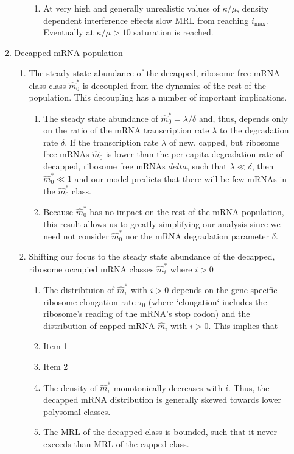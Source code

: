 \documentclass[review]{elsarticle}
\newcommand{\imax}{\ensuremath{i_{\max}}\xspace}
\newcommand{\mhat}{\ensuremath{\hat{m}}\xspace}
\begin{document}
\begin{enumerate}
\begin{enumerate}
\begin{enumerate}
\begin{enumerate}
      \item At very high and generally unrealistic values of $\kappa/\mu$, density dependent interference effects slow MRL from reaching \imax. Eventually at $\kappa/\mu > 10$ saturation is reached.
      \end{enumerate}
    \end{enumerate}
  \item Decapped mRNA population
    \begin{enumerate}
    \item The steady state abundance of the decapped, ribosome free mRNA class class  $\mhat_0^*$  is decoupled from the dynamics of the rest of the population.
      This decoupling has a number of important implications.
      \begin{enumerate}
      \item The steady state abundance of $\mhat_0^* = \lambda/\delta$ and, thus, depends only on the ratio of the mRNA transcription rate $\lambda$ to the degradation rate $\delta$.
        If the transcription rate $\lambda$ of new, capped, but ribosome free mRNAs $\mhat_0$ is lower than the per capita degradation rate of decapped, ribosome free mRNAs $delta$, such that  $\lambda \ll \delta$, then $\mhat_0^* \ll 1$ and our model predicts that there will be few mRNAs in the $\mhat_0^*$ class.
      \item Because $\mhat^*_0$ has no impact on the rest of the mRNA population, this result allows us to greatly simplifying our analysis since we need not consider $\mhat_0^*$ nor the mRNA degradation parameter $\delta$.
      \end{enumerate}
    \item Shifting our focus to the steady state abundance of the decapped, ribosome occupied mRNA classes  $\mhat_i^*$ where $i > 0$
      \begin{enumerate}
      \item The distribtuion of $\mhat^*_i$  with $i > 0 $ depends on the gene specific ribosome elongation rate $\tau_0$ (where `elongation`  includes the ribosome's reading of the mRNA's stop codon) and the distribution of capped mRNA $\mhat_i$ with $i > 0$.
        This implies that
        \item Item 1
        \item Item 2
        \item The density of $\mhat^*_i$ monotonically decreases with $i$.
        Thus, the decapped mRNA distribution is generally skewed towards lower polysomal classes.
      \item The MRL of the decapped class is bounded, such that it never exceeds than  MRL of the capped class.

\end{enumerate}
\end{enumerate}
\end{enumerate}
\end{enumerate}
\end{document}
